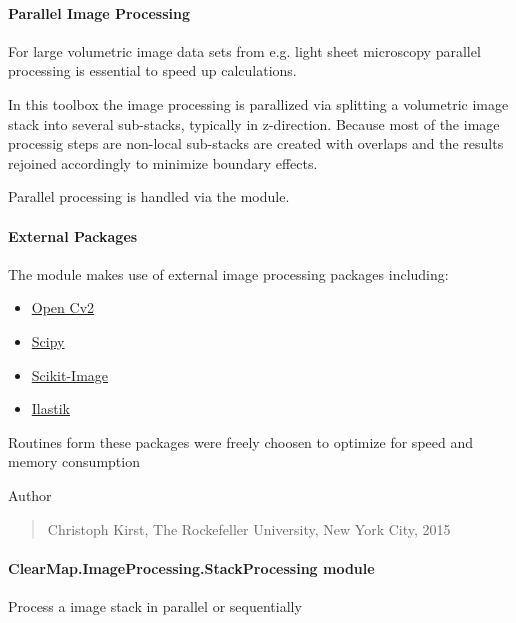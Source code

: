 \documentclass[letterpaper,10pt,english]{sphinxmanual}
\begin{document}
\paragraph{Parallel Image Processing}
\label{api/ClearMap.ImageProcessing:parallel-image-processing}
For large volumetric image data sets from e.g. light sheet microscopy
parallel processing is essential to speed up calculations.

In this toolbox the image processing is parallized via splitting a volumetric
image stack into several sub-stacks, typically in z-direction. Because most of
the image processig steps are non-local sub-stacks are created with overlaps
and the results rejoined accordingly to minimize boundary effects.

Parallel processing is handled via the
{\hyperref[api/ClearMap.ImageProcessing:module-ClearMap.ImageProcessing.StackProcessing]{\emph{}}} module.


\paragraph{External Packages}
\label{api/ClearMap.ImageProcessing:external-packages}
The {\hyperref[api/ClearMap.ImageProcessing:module-ClearMap.ImageProcessing]{\emph{}}} module makes use of external image
processing packages including:
\begin{itemize}
\item {} 
\href{http://opencv.org/}{Open Cv2}

\item {} 
\href{http://www.scipy.org/}{Scipy}

\item {} 
\href{http://scikit-image.org/docs/dev/api/skimage.html}{Scikit-Image}

\item {} 
\href{http://ilastik.org/}{Ilastik}

\end{itemize}

Routines form these packages were freely choosen to optimize for speed and
memory consumption

Author
\begin{quote}

Christoph Kirst, The Rockefeller University, New York City, 2015
\end{quote}


\paragraph{ClearMap.ImageProcessing.StackProcessing module}
\label{api/ClearMap.ImageProcessing:clearmap-imageprocessing-stackprocessing-module}\label{api/ClearMap.ImageProcessing:module-ClearMap.ImageProcessing.StackProcessing}
Process a image stack in parallel or sequentially
\end{document}
